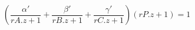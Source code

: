 \documentclass{article}
\begin{document}
\thispagestyle{empty}

$$
\left(\frac{\alpha'}{rA.z+1} + \frac{\beta'}{rB.z+1} + \frac{\gamma'}{rC.z+1}\right) (rP.z+1) = 1
$$
\end{document}
